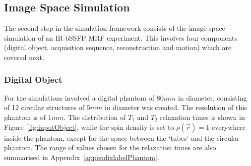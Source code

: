 


\subsection{Image Space Simulation}
\label{method:imagespace}

The second step in the simulation framework consists of the image space simulation of an IR-bSSFP MRF experiment.
This involves four components (digital object, acquisition sequence, reconstruction and motion) which are covered next.

\subsubsection{Digital Object}

For the simulations involved a digital phantom of $80mm$ in diameter, consisting of 12 circular structures of $5mm$ in diameter was created.
The resolution of this phantom is of $1mm$.
The distribution of $T_1$ and $T_2$ relaxation times is shown in Figure~\ref{fig:inputObject}, while the spin density is set to $\rho(\vec{r}) = 1$ everywhere inside the phantom, except for the space between the `tubes' and the circular phantom.
The range of values chosen for the relaxation times are also summarised in Appendix~\ref{appendixlabelPhantom}.

